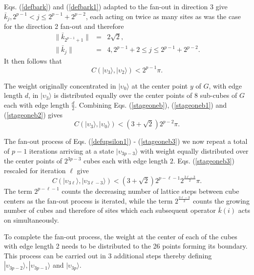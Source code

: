 \documentclass[12pt,amsmath,amssymb,onecolumn]{revtex4-2}
\begin{document}
Eqs. (\ref{defbark}) and (\ref{defbark1}) adapted to the fan-out in direction 3
give $\bar{k}_j, 2^{p-1} < j \le 2^{p-1} + 2^{p-2}$, each acting on twice as
many sites as was the case for the direction 2 fan-out and therefore
\begin{subequations}
\begin{eqnarray}
       \label{defbarkn3}
 \!\!\!\!\!\!\!\!\!\!\!\!\!\!\!\!\!      \parallel \bar{k}_ {2^{p-1} + 1} \parallel  &=&  2\sqrt{2}, \\
   \label{defbark1n3}
\!\!\!\!\!\!\!\!\!\!\!\!\!\!\!\!\!  \parallel \bar{k}_j\parallel &=&   4, 2^{p-1}+ 2 \le j \le 2^{p-1} + 2^{p-2}.
\end{eqnarray}
\end{subequations}
It then follows that
\begin{equation}
  \label{stageoneb2}
  C( |\upsilon_3 \rangle , |\upsilon_2 \rangle ) <2^{p-1} \pi.
\end{equation}

The weight originally concentrated in $|\upsilon_0 \rangle $ at the center point $y$ of
$G$, with edge length $d$, in $|\upsilon_3 \rangle $ is distributed equally over the center points
of 8 sub-cubes of $G$ each with edge length $\frac{d}{2}$. 
Combining Eqs. (\ref{stageoneb}), (\ref{stageoneb1}) and (\ref{stageoneb2}) gives
\begin{equation}
  \label{stageoneb3}
  C( |\upsilon_3 \rangle , |\upsilon_0 \rangle ) < (3+ \sqrt{2}) 2^{p-2} \pi.
\end{equation}

The fan-out process of Eqs. (\ref{defupsilon1}) - (\ref{stageoneb3}) we now repeat 
a total of $p-1$ iterations arriving at a state $|\upsilon_{3 p - 3} \rangle $ with weight
equally distributed over the center points of $2^{3 p - 3}$ cubes each with edge length
$2$.
Eqs. (\ref{stageoneb3}) rescaled for iteration $\ell$ give
\begin{equation}
\label{iterationell}
C( |\upsilon_{3 \ell} \rangle , |\upsilon_{3 \ell - 3} \rangle ) < (3+\sqrt{2}) 2^{p-\ell-1} 2^{\frac{3\ell - 3}{2}} \pi.
\end{equation}
The term $2^{p-\ell - 1}$ counts the decreasing number of lattice steps between cube centers as
the fan-out process is iterated, while the term $2^{\frac{3\ell - 3}{2}}$
counts the growing number of cubes and therefore 
of sites which each subsequent operator $\bar{k}(i)$ acts on simultaneously.

To complete the fan-out process, the weight at the center of each of the cubes with edge
length 2 needs to
be distributed to the 26 points forming its boundary.
This process can be carried out in 3 additional steps thereby defining
$|\upsilon_{3p -2} \rangle , |\upsilon_{3p-1} \rangle $ and $|\upsilon_{3p} \rangle $.
\end{document}
